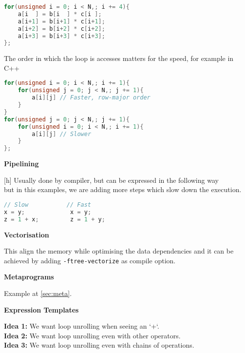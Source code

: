 \documentclass[fontsize=8pt, a4paper, landscape, fleqn]{scrartcl}
\renewcommand{\subsection}[1]{%
    \noindent\colorbox{subsectioncolor}{%
        \parbox{\dimexpr\columnwidth-2\fboxsep}{\color{white}\textbf{#1}}}%
    \vspace{0.5mm}%
}
\begin{document}
\begin{multicols*}{3}[\raggedcolumns]
\begin{lstlisting}[language=C++, breaklines]
for(unsigned i = 0; i < N,; i += 4){
    a[i  ] = b[i  ] * c[i ];
    a[i+1] = b[i+1] * c[i+1];
    a[i+2] = b[i+2] * c[i+2];
    a[i+3] = b[i+3] * c[i+3];
}; \end{lstlisting}
    The order in which the loop is accesses matters for the speed, for example in C++
\begin{lstlisting}[language=C++, breaklines]
for(unsigned i = 0; i < N,; i += 1){
    for(unsigned j = 0; j < N,; j += 1){
        a[i][j] // Faster, row-major order
    }
}
for(unsigned j = 0; j < N,; j += 1){
    for(unsigned i = 0; i < N,; i += 1){
        a[i][j] // Slower
    }
}; 
\end{lstlisting}
    
  \subsection{Pipelining}[h]
Usually done by compiler, but can be expressed in the following way\\
but in this examples, we are adding more steps which slow down the execution.
\begin{lstlisting}[language=C++]
// Slow           // Fast
x = y;             x = y;
z = 1 + x;         z = 1 + y;\end{lstlisting}
    \subsection{Vectorisation}
    This align the memory while optimising the data dependencies and it can be achieved by adding \lstinline{-ftree-vectorize} as compile option.
    
    \subsection{Metaprograms}
    Example at \colorbox{violet!8}{\autoref{sec:meta}}.
    
    
\subsection{Expression Templates}
\textbf{Idea 1:} We want loop unrolling when seeing an `+`. \\
\textbf{Idea 2:} We want loop unrolling even with other operators. \\
\textbf{Idea 3:} We want loop unrolling even with chains of operations. \\


\end{multicols*}
\end{document}
